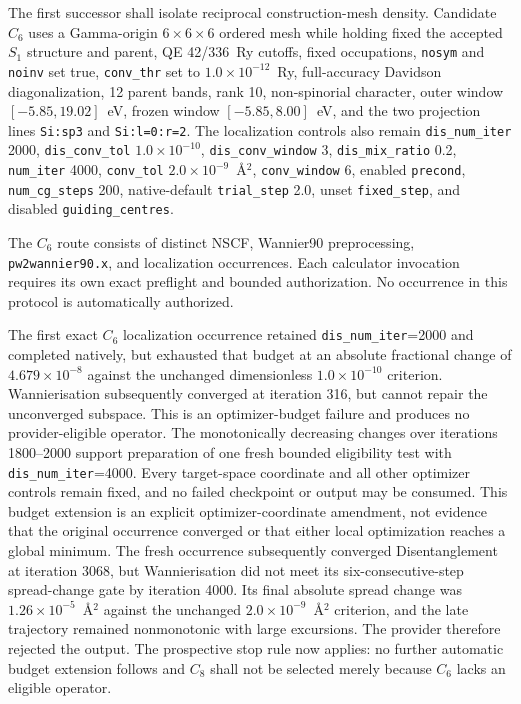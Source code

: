 \documentclass[11pt]{report}
\begin{document}
The first successor shall isolate reciprocal construction-mesh density.  Candidate
$C_6$ uses a Gamma-origin $6\times6\times6$ ordered mesh while holding fixed the accepted
$S_1$ structure and parent, QE 42/336~Ry cutoffs, fixed occupations,
\texttt{nosym} and \texttt{noinv} set true, \texttt{conv\_thr} set to
$1.0\times10^{-12}$~Ry, full-accuracy Davidson diagonalization, 12 parent bands,
rank 10, non-spinorial character, outer window
$[-5.85,19.02]$~eV, frozen window $[-5.85,8.00]$~eV, and the two projection lines
\texttt{Si:sp3} and \texttt{Si:l=0:r=2}.  The localization controls also remain
\texttt{dis\_num\_iter} 2000, \texttt{dis\_conv\_tol} $1.0\times10^{-10}$,
\texttt{dis\_conv\_window} 3, \texttt{dis\_mix\_ratio} 0.2,
\texttt{num\_iter} 4000, \texttt{conv\_tol} $2.0\times10^{-9}$~\AA$^2$,
\texttt{conv\_window} 6, enabled \texttt{precond}, \texttt{num\_cg\_steps} 200,
native-default \texttt{trial\_step} 2.0, unset \texttt{fixed\_step}, and disabled
\texttt{guiding\_centres}.

The $C_6$ route consists of distinct NSCF, Wannier90 preprocessing,
\texttt{pw2wannier90.x}, and localization occurrences.  Each calculator invocation
requires its own exact preflight and bounded authorization.  No occurrence in this
protocol is automatically authorized.

The first exact $C_6$ localization occurrence retained
\texttt{dis\_num\_iter}=2000 and completed natively, but exhausted that budget at an
absolute fractional change of $4.679\times10^{-8}$ against the unchanged dimensionless
$1.0\times10^{-10}$ criterion.  Wannierisation subsequently converged at iteration 316,
but cannot repair the unconverged subspace.  This is an optimizer-budget failure and
produces no provider-eligible operator.  The monotonically decreasing changes over
iterations 1800--2000 support preparation of one fresh bounded eligibility test with
\texttt{dis\_num\_iter}=4000.  Every target-space coordinate and all other optimizer
controls remain fixed, and no failed checkpoint or output may be consumed.  This budget
extension is an explicit optimizer-coordinate amendment, not evidence that the original
occurrence converged or that either local optimization reaches a global minimum.  The
fresh occurrence subsequently converged Disentanglement at iteration 3068, but
Wannierisation did not meet its six-consecutive-step spread-change gate by iteration
4000.  Its final absolute spread change was $1.26\times10^{-5}$~\AA$^2$ against the
unchanged $2.0\times10^{-9}$~\AA$^2$ criterion, and the late trajectory remained
nonmonotonic with large excursions.  The provider therefore rejected the output.  The
prospective stop rule now applies: no further automatic budget extension follows and
$C_8$ shall not be selected merely because $C_6$ lacks an eligible operator.
\end{document}
